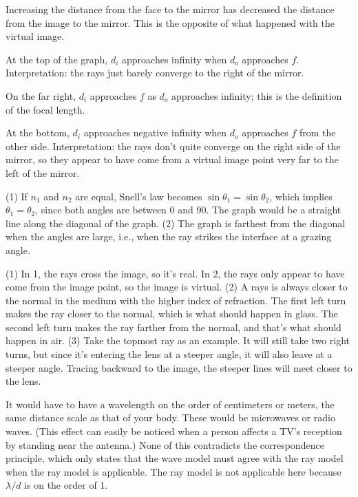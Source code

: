 Increasing the distance from the face to the mirror has decreased the distance
from the image to the mirror. This is the opposite of what happened with the virtual
image.

At the top of the graph, $d_i$ approaches infinity when $d_o$ approaches $f$. Interpretation:
the rays just barely converge to the right of the mirror.

On the far right, $d_i$ approaches
$f$ as $d_o$ approaches infinity; this is the definition of the focal length.

At the bottom, $d_i$ approaches negative infinity when $d_o$ approaches $f$ from the
other side. Interpretation: the rays don't quite converge on the right side of the mirror,
so they appear to have come from a virtual image point very far to the left of the
mirror.

(1) If $n_1$ and $n_2$ are equal, Snell's law becomes $\sin\theta_1=\sin\theta_2$, which implies
$\theta_1=\theta_2$, since both angles are between 0 and 90\degunit. The graph would be a straight
line along the diagonal of the graph. (2) The graph is farthest from the diagonal when the angles
are large, i.e., when the ray strikes the interface at a grazing angle.

(1) In 1, the rays cross the image, so it's real. In 2, the rays only appear to have come from the
image point, so the image is virtual.
(2) A rays is always closer to the normal in the medium with the higher index of refraction. The first
left turn makes the ray closer to the normal, which is what should happen in glass. The second left
turn makes the ray farther from the normal, and that's what should happen in air.
(3) Take the topmost ray as an example. It will still take two right turns, but since it's entering
the lens at a steeper angle, it will also leave at a steeper angle. Tracing backward to the image,
the steeper lines will meet closer to the lens.

It would have to have a wavelength on the order of centimeters or meters, the same distance scale
as that of your body. These would be microwaves or radio waves. (This effect can easily be noticed
when a person affects a TV's reception by standing near the antenna.) None of this contradicts the
correspondence principle, which only states that the wave model must agree with the ray model when the
ray model is applicable. The ray model is not applicable here because $\lambda/d$ is on the order
of 1.

